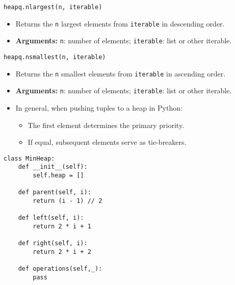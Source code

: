 \begin{summary}
\begin{lstlisting}
heapq.nlargest(n, iterable)
\end{lstlisting}
\begin{itemize}
    \item Returns the \texttt{n} largest elements from \texttt{iterable} in descending order.
    \item \textbf{Arguments:} \texttt{n}: number of elements; \texttt{iterable}: list or other iterable.
\end{itemize}
    
\begin{lstlisting}
heapq.nsmallest(n, iterable)
\end{lstlisting}
\begin{itemize}[noitemsep]
    \item Returns the \texttt{n} smallest elements from \texttt{iterable} in ascending order.
    \item \textbf{Arguments:} \texttt{n}: number of elements; \texttt{iterable}: list or other iterable.
\end{itemize}        
\end{summary}

\begin{notes}
    \begin{itemize}
        \item In general, when pushing tuples to a heap in Python:
        \begin{itemize}
            \item The first element determines the primary priority.
            \item If equal, subsequent elements serve as tie-breakers.
        \end{itemize}
    \end{itemize}
\end{notes}
\newpage

\begin{algo}
\begin{lstlisting}
class MinHeap:
    def __init__(self):
        self.heap = []

    def parent(self, i):
        return (i - 1) // 2

    def left(self, i):
        return 2 * i + 1

    def right(self, i):
        return 2 * i + 2

    def operations(self,_):
        pass
\end{lstlisting}
        
        
\end{algo}
\newpage


